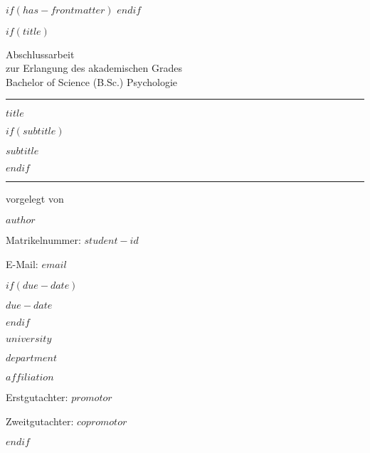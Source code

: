 $if(has-frontmatter)$
\frontmatter
$endif$

$if(title)$
\thispagestyle{empty}
{\centering
Abschlussarbeit \\
zur Erlangung des akademischen Grades \\
Bachelor of Science (B.Sc.) Psychologie \\
\vspace*{10mm}
\hrule
\vspace*{15mm}
{\large\bfseries $title$ \par}
$if(subtitle)$
{\large\bfseries $subtitle$ \par}
$endif$

\vspace*{15mm}
\hrule
\vspace*{10mm}
vorgelegt von  \\ 
{\large\bfseries $author$ \par}
\smallskip
{Matrikelnummer: $student-id$ \par}
{E-Mail: $email$ \par}

\bigskip 

$if(due-date)$
{\textmd\large $due-date$ \par}
$endif$

{\textmd\large $university$ \par}
{\textmd\large $department$ \par}
{\textmd\large $affiliation$ \par}

\bigskip\bigskip\bigskip

{Erstgutachter: $promotor$ \par}
{Zweitgutachter: $copromotor$ \par}

\vspace*{10mm}

}
$endif$